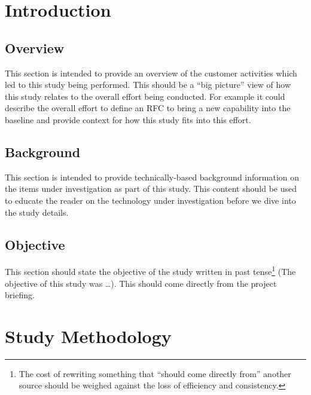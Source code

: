 \chapter{Introduction}
\label{sec:Introduction}

\section{Overview}
\label{sec:Overview}

This section is intended to provide an overview of the
customer activities which led to this study being performed.  This
should be a ``big picture'' view of how this study relates to the
overall effort being conducted. For example it could describe the
overall effort to define an \gls{RFC} to bring a new capability into
the baseline and provide context for how this study fits into
this effort.

\section{Background}
\label{sec:Background}

This section is intended to provide technically-based
background information on the items under investigation as part of
this study.  This content should be used to educate the reader on the
technology under investigation before we dive into the study details.

\section{Objective}
\label{sec:Objective}

This section should state the objective of the
study written in past tense\footnote{%
  \label{fn:pastTense}%
  The cost of rewriting something that ``should come directly from''
  another source should be weighed against the loss of efficiency and
  consistency. %
} (The objective of this study was \ldots). This should come directly
from the project briefing.


\chapter{Study Methodology}
\label{sec:StudyMethodology}

